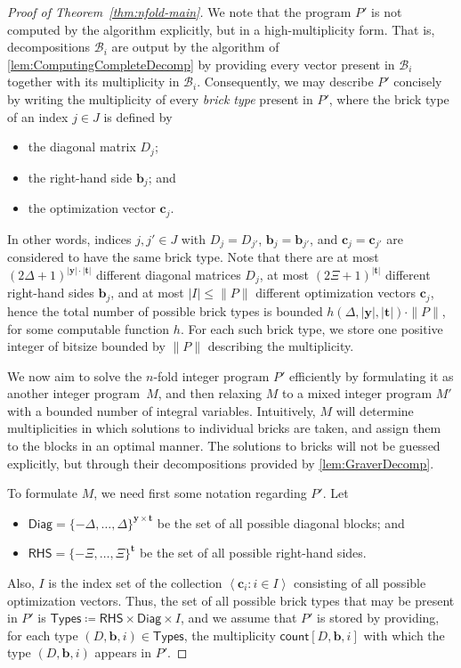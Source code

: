 \documentclass{theoretics}
\renewcommand{\leq}{\leqslant}
\newcommand{\Bb}{\mathcal{B}}
\newcommand{\tup}[1]{{\mathbf{#1}}}
\newcommand{\yy}{\tup y}
\newcommand{\tv}{\tup t}
\newcommand{\bb}{\tup b}
\newcommand{\cc}{\tup c}
\newcommand{\matrices}[3]{#1^{#2\times #3}}
\newcommand{\mset}[1]{\left\langle #1\right\rangle}
\newcommand{\RHS}{\mathsf{RHS}}
\newcommand{\Diag}{\mathsf{Diag}}
\newcommand{\Types}{\mathsf{Types}}
\newcommand{\cntTypes}{\mathsf{count}}
\begin{document}
\begin{proof}[Proof of Theorem~\ref{thm:nfold-main}]
We note that the program $P'$ is not computed by the algorithm explicitly, but in a high-multiplicity form. That is, decompositions $\Bb_i$ are output by the algorithm of \cref{lem:ComputingCompleteDecomp} by providing every vector present in $\Bb_i$ together with its multiplicity in $\Bb_i$. Consequently, we may describe $P'$ concisely by writing the multiplicity of every {\em{brick type}} present in $P'$, where the brick type of an index $j\in J$ is defined by
\begin{itemize}[nosep]
    \item the diagonal matrix $D_{j}$;
    \item the right-hand side $\bb_{j}$; and
    \item the optimization vector $\cc_{j}$.
\end{itemize}
In other words, indices $j,j'\in J$ with $D_j=D_{j'}$, $\bb_j=\bb_{j'}$, and $\cc_j=\cc_{j'}$ are considered to have the same brick type. Note that there are at most $(2\Delta+1)^{|\yy|\cdot |\tv|}$ different diagonal matrices $D_j$, at most $(2\Xi+1)^{|\tv|}$ different right-hand sides $\bb_j$, and at most $|I|\leq \|P\|$ different optimization vectors $\cc_j$, hence the total number of possible brick types is bounded $h(\Delta,|\yy|,|\tv|)\cdot \|P\|$, for some computable function $h$. For each such brick type, we store one positive integer of bitsize bounded by $\|P\|$ describing the multiplicity.

We now aim to solve the $n$-fold integer program $P'$ efficiently by formulating it as another integer program~$M$, and then relaxing $M$ to a mixed integer program $M'$ with a bounded number of integral variables. Intuitively, $M$ will determine multiplicities in which solutions to individual bricks are taken, and assign them to the blocks in an optimal manner. The solutions to bricks will not be guessed explicitly, but through their decompositions provided by \cref{lem:GraverDecomp}.

To formulate $M$, we need first some notation regarding $P'$. Let
\begin{itemize}[nosep]
    \item $\Diag=\matrices{\{-\Delta,\ldots,\Delta\}}{\yy}{\tv}$ be the set of all possible diagonal blocks; and
    \item $\RHS=\{-\Xi,\ldots,\Xi\}^\tv$ be the set of all possible right-hand sides.
\end{itemize}
Also, $I$ is the index set of the collection $\mset{\cc_i\colon i\in I}$ consisting of all possible optimization vectors.
Thus, the set of all possible brick types that may be present in $P'$ is $\Types\coloneqq \RHS\times \Diag\times I$, and we assume that $P'$ is stored by providing, for each type $(D,\bb,i)\in \Types$, the multiplicity $\cntTypes[D,\bb,i]$ with which the type $(D,\bb,i)$ appears in $P'$.


\end{proof}
\end{document}
